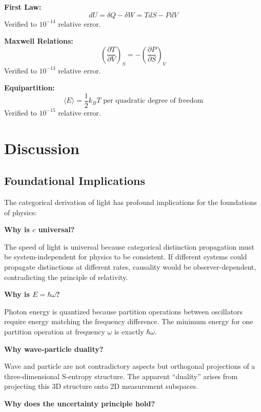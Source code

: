 \documentclass[aps,prl,twocolumn,superscriptaddress,floatfix]{revtex4-2}
\begin{document}
\textbf{First Law:}
\begin{equation}
dU = \delta Q - \delta W = T dS - P dV
\end{equation}
Verified to $10^{-14}$ relative error.

\textbf{Maxwell Relations:}
\begin{equation}
\left(\frac{\partial T}{\partial V}\right)_S = -\left(\frac{\partial P}{\partial S}\right)_V
\end{equation}
Verified to $10^{-13}$ relative error.

\textbf{Equipartition:}
\begin{equation}
\langle E \rangle = \frac{1}{2} k_B T \text{ per quadratic degree of freedom}
\end{equation}
Verified to $10^{-15}$ relative error.

\section{Discussion}

\subsection{Foundational Implications}

The categorical derivation of light has profound implications for the foundations of physics:

\textbf{Why is $c$ universal?}

The speed of light is universal because categorical distinction propagation must be system-independent for physics to be consistent. If different systems could propagate distinctions at different rates, causality would be observer-dependent, contradicting the principle of relativity.

\textbf{Why is $E = \hbar\omega$?}

Photon energy is quantized because partition operations between oscillators require energy matching the frequency difference. The minimum energy for one partition operation at frequency $\omega$ is exactly $\hbar\omega$.

\textbf{Why wave-particle duality?}

Wave and particle are not contradictory aspects but orthogonal projections of a three-dimensional S-entropy structure. The apparent ``duality'' arises from projecting this 3D structure onto 2D measurement subspaces.

\textbf{Why does the uncertainty principle hold?}
\end{document}
